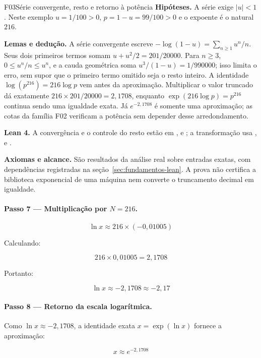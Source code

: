 \begin{resultado}
\begin{formalizacao}{F03}{Série convergente, resto e retorno à potência}
\textbf{Hipóteses.} A série exige $|u|<1$. Neste exemplo $u=1/100>0$, $p=1-u=99/100>0$ e o expoente é o natural $216$.

\textbf{Lemas e dedução.} A série convergente escreve $-\log(1-u)=\sum_{n\geq1}u^n/n$. Seus dois primeiros termos somam $u+u^2/2=201/20000$. Para $n\geq3$, $0\leq u^n/n\leq u^n$, e a cauda geométrica soma $u^3/(1-u)=1/990000$; isso limita o erro, sem supor que o primeiro termo omitido seja o resto inteiro. A identidade $\log(p^{216})=216\log p$ vem antes da aproximação. Multiplicar o valor truncado dá exatamente $216\times201/20000=2{,}1708$, enquanto $\exp(216\log p)=p^{216}$ continua sendo uma igualdade exata. Já $e^{-2{,}1708}$ é somente uma aproximação; as cotas da família F02 verificam a potência sem depender desse arredondamento.

\textbf{Lean 4.} A convergência e o controle do resto estão em ,  e ; a transformação usa ,  e .

\textbf{Axiomas e alcance.} São resultados da análise real sobre entradas exatas, com dependências registradas na seção~\ref{sec:fundamentos-lean}. A prova não certifica a biblioteca exponencial de uma máquina nem converte o truncamento decimal em igualdade.
\end{formalizacao}

\paragraph{Passo 7 — Multiplicação por $N = 216$.}

\[
\ln x \approx 216 \times (-0{,}01005)
\]

Calculando:

\[
216 \times 0{,}01005 = 2{,}1708
\]

Portanto:

\[
\ln x \approx -2{,}1708 \approx -2{,}17
\]

\paragraph{Passo 8 — Retorno da escala logarítmica.}
Como $\ln x \approx -2{,}1708$, a identidade exata $x=\exp(\ln x)$ fornece a aproximação:

\[
x \approx e^{-2{,}1708}
\]


\end{resultado}
